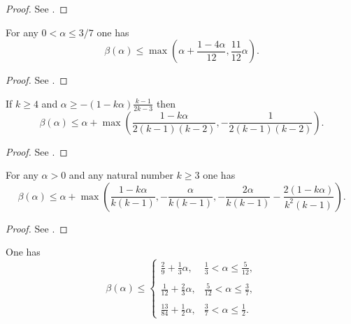\literature
{}

\begin{proof}
See \cite[Proposition~1, Theorem~1]{huxley_exponential_2005}.
\end{proof}


\begin{theorem}\label{beta-R} For any $0 < \alpha \le 3/7$ one has
\[
\beta(\alpha) \le \max\left(\alpha + \frac{1 - 4\alpha}{12}, \frac{11}{12}\alpha\right).
\]
\end{theorem}


\literature
{}

\begin{proof}
See \cite[Theorem~1]{robert_fourth_2016}.
\end{proof}

\begin{theorem}\label{beta-R2} If $k \geq 4$ and $\alpha \geq -(1-k\alpha) \frac{k-1}{2k-3}$ then
$$ \beta(\alpha) \leq \alpha + \max( \frac{1-k\alpha}{2(k-1)(k-2)}, -\frac{1}{2(k-1)(k-2)}).$$
\end{theorem}

\literature
{}

\begin{proof} See \cite[Theorem 10]{robert_2016}.
\end{proof}


\begin{theorem}\label{beta-HB}  For any $\alpha > 0$ and any natural number $k \geq 3$ one has
$$ \beta(\alpha) \leq \alpha + \max\left( \frac{1-k\alpha}{k(k-1)}, -\frac{\alpha}{k(k-1)}, -\frac{2\alpha}{k(k-1)} - \frac{2(1-k\alpha)}{k^2(k-1)}\right).$$
\end{theorem}

\literature
{}

\begin{proof}
See \cite[Theorem~1]{heathbrown_new_2017}.
\end{proof}


\begin{theorem}\label{beta-Bourgain} One has
\[
\beta(\alpha) \le \begin{cases}
\displaystyle\frac{2}{9} + \frac{1}{3}\alpha,&\displaystyle\frac{1}{3} < \alpha \le \frac{5}{12},\\
\\
\displaystyle\frac{1}{12} + \frac{2}{3}\alpha,&\displaystyle\frac{5}{12} < \alpha \le \frac{3}{7},\\
\\
\displaystyle\frac{13}{84} + \frac{1}{2}\alpha,&\displaystyle\frac{3}{7} < \alpha \le \frac{1}{2}.
\end{cases}
\]
\end{theorem}

